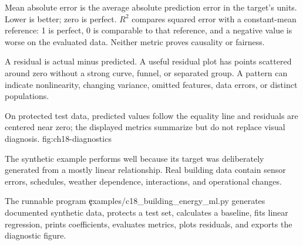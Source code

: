 Mean absolute error is the average absolute prediction error in the target's
units. Lower is better; zero is perfect. $R^2$ compares squared error with a
constant-mean reference: 1 is perfect, 0 is comparable to that reference, and a
negative value is worse on the evaluated data. Neither metric proves causality
or fairness.


A residual is actual minus predicted. A useful residual plot has points
scattered around zero without a strong curve, funnel, or separated group. A
pattern can indicate nonlinearity, changing variance, omitted features, data
errors, or distinct populations.

{On protected test data, predicted values follow the equality line and residuals are centered near zero; the displayed metrics summarize but do not replace visual diagnosis.}
{fig:ch18-diagnostics}

The synthetic example performs well because its target was deliberately
generated from a mostly linear relationship. Real building data contain sensor
errors, schedules, weather dependence, interactions, and operational changes.

\label{sec:c18-application}

The runnable program \c{examples/c18_building_energy_ml.py} generates documented
synthetic data, protects a test set, calculates a baseline, fits linear
regression, prints coefficients, evaluates metrics, plots residuals, and exports
the diagnostic figure.

